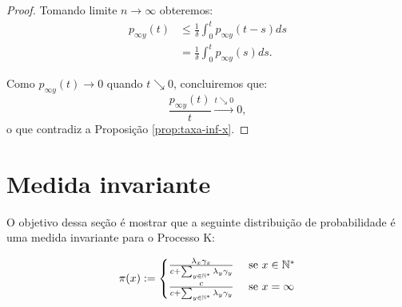 \begin{proof}
  Tomando limite $n \to \infty$ obteremos:
  \begin{align*}
     p_{\infty y}(t)
     &\leq \frac{1}{\delta} \int_0^t p_{\infty y}(t - s) d s\\
     &  =  \frac{1}{\delta} \int_0^t p_{\infty y}(s) d s .
  \end{align*}

  Como  $p_{\infty y}(t) \to 0$ quando $t \searrow 0$, concluiremos que:
  \begin{displaymath}
    \frac{p_{\infty y}(t)}{t} \xrightarrow{t \searrow 0} 0,
  \end{displaymath}
  o que contradiz a Proposição \ref{prop:taxa-inf-x}.
\end{proof}


\section{Medida invariante}
\label{sec:invariante}

O objetivo dessa seção é mostrar que a seguinte distribuição de
probabilidade é uma medida invariante para o Processo K:

\begin{equation}
  \label{eq:invariante}
  \pi(x) := \begin{cases}
    \frac{\lambda_x \gamma_x}{c + \sum_{y \in {\mathbb{N^*}}} \lambda_y \gamma_y}
    & \textrm{ se } x \in {\mathbb{N^*}} \\
    \frac{c}{c + \sum_{y \in {\mathbb{N^*}}} \lambda_y \gamma_y}
    & \textrm{ se } x = \infty \\
  \end{cases}
\end{equation}

